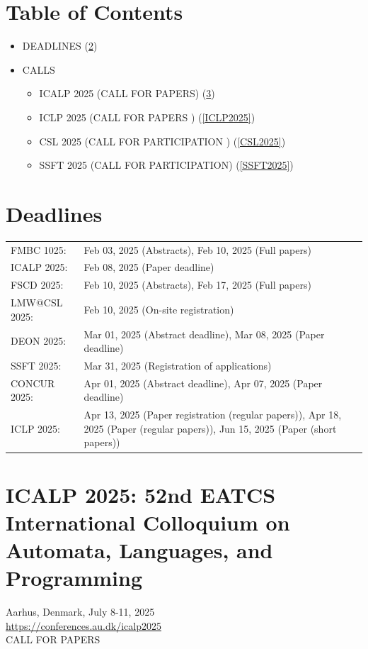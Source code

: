 \documentclass[prodmode,acmtecs]{acmsmall} %
\begin{document}
\section{Table of Contents}\begin{itemize}\item DEADLINES (\cref{deadlines}) 
 
\item CALLS 
 
\begin{itemize}\item ICALP 2025 (CALL FOR PAPERS) (\cref{ICALP2025})
\item ICLP 2025 (CALL FOR PAPERS ) (\cref{ICLP2025})
\item CSL 2025 (CALL FOR PARTICIPATION ) (\cref{CSL2025})
\item SSFT 2025 (CALL FOR PARTICIPATION) (\cref{SSFT2025})
\end{itemize} 
\end{itemize}\section{Deadlines}\label{deadlines}\begin{tabulary}{\linewidth}{LL}FMBC 1025:  & Feb 03, 2025 (Abstracts), Feb 10, 2025 (Full papers) \\
ICALP 2025:  & Feb 08, 2025 (Paper deadline) \\
FSCD 2025:  & Feb 10, 2025 (Abstracts), Feb 17, 2025 (Full papers) \\
LMW@CSL 2025:  & Feb 10, 2025 (On-site registration) \\
DEON 2025:  & Mar 01, 2025 (Abstract deadline), Mar 08, 2025 (Paper deadline) \\
SSFT 2025:  & Mar 31, 2025 (Registration of applications) \\
CONCUR 2025:  & Apr 01, 2025 (Abstract deadline), Apr 07, 2025 (Paper deadline) \\
ICLP 2025:  & Apr 13, 2025 (Paper registration (regular papers)), Apr 18, 2025 (Paper  (regular papers)), Jun 15, 2025 (Paper  (short papers)) \\
\end{tabulary}
\section{ICALP 2025: 52nd EATCS International Colloquium on Automata, Languages, and Programming}\label{ICALP2025}  Aarhus, Denmark, July 8-11, 2025\\ 
  \href{https://conferences.au.dk/icalp2025}{https://conferences.au.dk/icalp2025}\\ 
CALL FOR PAPERS 
\end{document}
